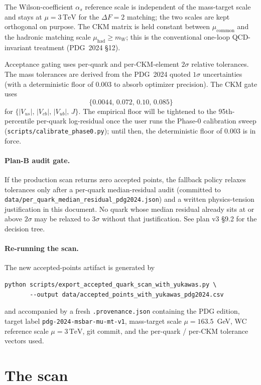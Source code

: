 \documentclass[11pt]{article}
\begin{document}
The Wilson-coefficient $\alpha_s$ reference scale is independent of the
mass-target scale and stays at $\mu = 3\,\mathrm{TeV}$ for the
$\Delta F = 2$ matching; the two scales are kept orthogonal on purpose.
The CKM matrix is held constant between $\mu_{\mathrm{common}}$ and the
hadronic matching scale $\mu_{\mathrm{had}} \ge m_W$; this is the
conventional one-loop QCD-invariant treatment (PDG~2024 §12).

Acceptance gating uses per-quark and per-CKM-element $2\sigma$ relative
tolerances. The mass tolerances are derived from the PDG~2024 quoted
$1\sigma$ uncertainties (with a deterministic floor of $0.003$ to absorb
optimizer precision). The CKM gate uses
\[
\{0.0044,\, 0.072,\, 0.10,\, 0.085\}
\]
for
$\{|V_{us}|,\, |V_{cb}|,\, |V_{ub}|,\, J\}$. The empirical
floor will be tightened to the 95th-percentile per-quark log-residual
once the user runs the Phase-0 calibration sweep
(\texttt{scripts/calibrate\_phase0.py}); until then, the deterministic
floor of $0.003$ is in force.

\paragraph{Plan-B audit gate.}
If the production scan returns zero accepted points, the fallback policy
relaxes tolerances only after a per-quark median-residual audit
(committed to \texttt{data/per\_quark\_median\_residual\_pdg2024.json})
and a written physics-tension justification in this document. No quark
whose median residual already sits at or above $2\sigma$ may be relaxed
to $3\sigma$ without that justification. See plan v3 §9.2 for the
decision tree.

\paragraph{Re-running the scan.}
The new accepted-points artifact is generated by
\begin{verbatim}
python scripts/export_accepted_quark_scan_with_yukawas.py \
       --output data/accepted_points_with_yukawas_pdg2024.csv
\end{verbatim}
and accompanied by a fresh \texttt{.provenance.json} containing the PDG
edition, target label \texttt{pdg-2024-msbar-mu-mt-v1}, mass-target
scale $\mu = 163.5$~GeV, WC reference scale $\mu = 3\,\mathrm{TeV}$,
git commit, and the per-quark / per-CKM tolerance vectors used.


\section{The scan}
\end{document}
